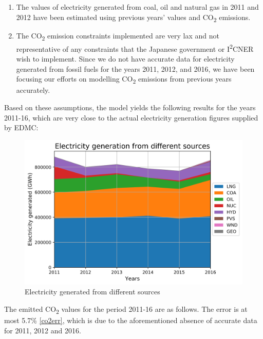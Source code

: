 \documentclass[14pt,a4paper]{article} %
\begin{document}
\begin{enumerate}
\item The values of electricity generated from coal, oil and natural gas in 2011 and 2012 have been estimated using previous years' values and CO\textsubscript{2} emissions.

\item The CO\textsubscript{2} emission constraints implemented are very lax and not representative of any constraints that the Japanese government or I\textsuperscript{2}CNER wish to implement. Since we do not have accurate data for electricity generated from fossil fuels for the years 2011, 2012, and 2016, we have been focusing our efforts on modelling CO\textsubscript{2} emissions from previous years accurately.

\end{enumerate}

Based on these assumptions, the model yields the following results for the years 2011-16, which are very close to the actual electricity generation figures supplied by EDMC:

\begin{figure}[H]
\centering
\includegraphics[scale=0.6]{elc-2016}
\caption{Electricity generated from different sources}
\end{figure}

The emitted CO\textsubscript{2} values for the period 2011-16 are as follows. The error is at most 5.7\% \ref{co2err}, which is due to the aforementioned absence of accurate data for 2011, 2012 and 2016. 
\end{document}
